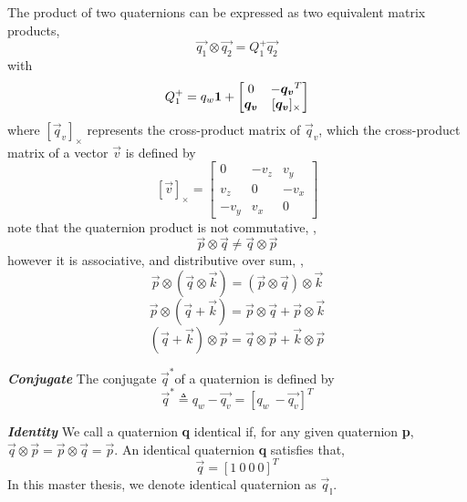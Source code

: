 The product of two quaternions can be expressed as two equivalent matrix products,
\begin{equation}\label{q4}
	\vec{q_1} \otimes \vec{q_2} = Q_1^+\vec{q_2}
\end{equation}
with
\begin{equation}\label{q5}
	Q_1^+ = q_w\mathbf{1} + \begin{bmatrix}
							  	0 &
							  	-\boldsymbol{q_v}^T\\
							  	\boldsymbol{q_v} &
							  	[\boldsymbol{q_v}]_\times
							  \end{bmatrix}
\end{equation}
where $[\vec{q}_v]_\times$ represents the cross-product matrix of $\vec{q}_v$, which the cross-product matrix of a vector $\vec{v}$ is defined by
\begin{equation} \label{q17}
	[\vec{v}]_\times =  \begin{bmatrix}
							0 & -v_z & v_y \\
							v_z & 0 & -v_x \\
							-v_y & v_x & 0 
						\end{bmatrix}
\end{equation}
note that the quaternion product is not commutative, \ie, 
\begin{equation}
	\vec{p} \otimes \vec{q} \neq \vec{q} \otimes \vec{p}
\end{equation}
however it is associative, and distributive over sum, \ie,
\begin{equation} \label{q26}
	\vec{p} \otimes (\vec{q} \otimes \vec{k}) = (\vec{p} \otimes \vec{q}) \otimes \vec{k}
\end{equation}
\begin{equation} \label{q27}
	\vec{p} \otimes (\vec{q} + \vec{k}) = \vec{p} \otimes \vec{q} + \vec{p} \otimes \vec{k}
\end{equation}
\begin{equation} \label{q28}
	(\vec{q} + \vec{k}) \otimes \vec{p} = \vec{q} \otimes \vec{p} + \vec{k} \otimes \vec{p}
\end{equation}

\textbf{\textit{Conjugate}} The conjugate $\vec{q}^*$of a quaternion is defined by
\begin{equation}\label{q6}
	\vec{q}^* \triangleq q_w - \vec{q_v} = \left[ q_w \ - \vec{q_v} \right]^T
\end{equation}

\textbf{\textit{Identity}} We call a quaternion \textbf{q} identical if, for any given quaternion \textbf{p}, $\vec{q} \otimes \vec{p} = \vec{p} \otimes \vec{q} = \vec{p}$. An identical quaternion \textbf{q} satisfies that,
\begin{equation}\label{q8}
	\vec{q} = \left[1 \ 0 \ 0 \ 0 \right]^T
\end{equation}
In this master thesis, we denote identical quaternion as $\vec{q}_{\mathbb{I}}$.

